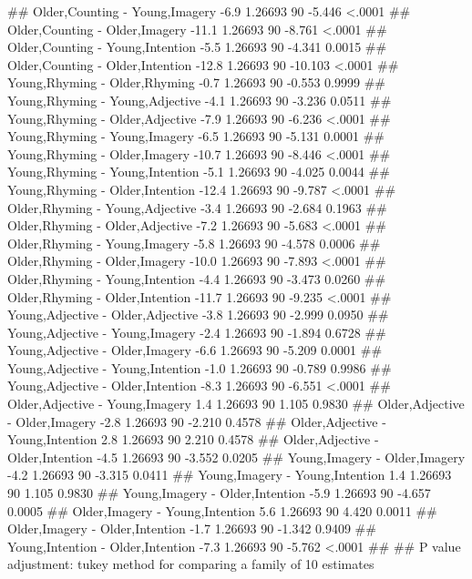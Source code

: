 \documentclass[]{article}
\newenvironment{Shaded}{\begin{snugshade}}{\end{snugshade}}
\newcommand{\NormalTok}[1]{#1}
\theoremstyle{definition}
\theoremstyle{definition}
\theoremstyle{definition}
\theoremstyle{remark}
\begin{document}
\begin{Shaded}
\begin{Highlighting}[]
\NormalTok{##  Older,Counting - Young,Imagery        -6.9 1.26693 90  -5.446  <.0001}
\NormalTok{##  Older,Counting - Older,Imagery       -11.1 1.26693 90  -8.761  <.0001}
\NormalTok{##  Older,Counting - Young,Intention      -5.5 1.26693 90  -4.341  0.0015}
\NormalTok{##  Older,Counting - Older,Intention     -12.8 1.26693 90 -10.103  <.0001}
\NormalTok{##  Young,Rhyming - Older,Rhyming         -0.7 1.26693 90  -0.553  0.9999}
\NormalTok{##  Young,Rhyming - Young,Adjective       -4.1 1.26693 90  -3.236  0.0511}
\NormalTok{##  Young,Rhyming - Older,Adjective       -7.9 1.26693 90  -6.236  <.0001}
\NormalTok{##  Young,Rhyming - Young,Imagery         -6.5 1.26693 90  -5.131  0.0001}
\NormalTok{##  Young,Rhyming - Older,Imagery        -10.7 1.26693 90  -8.446  <.0001}
\NormalTok{##  Young,Rhyming - Young,Intention       -5.1 1.26693 90  -4.025  0.0044}
\NormalTok{##  Young,Rhyming - Older,Intention      -12.4 1.26693 90  -9.787  <.0001}
\NormalTok{##  Older,Rhyming - Young,Adjective       -3.4 1.26693 90  -2.684  0.1963}
\NormalTok{##  Older,Rhyming - Older,Adjective       -7.2 1.26693 90  -5.683  <.0001}
\NormalTok{##  Older,Rhyming - Young,Imagery         -5.8 1.26693 90  -4.578  0.0006}
\NormalTok{##  Older,Rhyming - Older,Imagery        -10.0 1.26693 90  -7.893  <.0001}
\NormalTok{##  Older,Rhyming - Young,Intention       -4.4 1.26693 90  -3.473  0.0260}
\NormalTok{##  Older,Rhyming - Older,Intention      -11.7 1.26693 90  -9.235  <.0001}
\NormalTok{##  Young,Adjective - Older,Adjective     -3.8 1.26693 90  -2.999  0.0950}
\NormalTok{##  Young,Adjective - Young,Imagery       -2.4 1.26693 90  -1.894  0.6728}
\NormalTok{##  Young,Adjective - Older,Imagery       -6.6 1.26693 90  -5.209  0.0001}
\NormalTok{##  Young,Adjective - Young,Intention     -1.0 1.26693 90  -0.789  0.9986}
\NormalTok{##  Young,Adjective - Older,Intention     -8.3 1.26693 90  -6.551  <.0001}
\NormalTok{##  Older,Adjective - Young,Imagery        1.4 1.26693 90   1.105  0.9830}
\NormalTok{##  Older,Adjective - Older,Imagery       -2.8 1.26693 90  -2.210  0.4578}
\NormalTok{##  Older,Adjective - Young,Intention      2.8 1.26693 90   2.210  0.4578}
\NormalTok{##  Older,Adjective - Older,Intention     -4.5 1.26693 90  -3.552  0.0205}
\NormalTok{##  Young,Imagery - Older,Imagery         -4.2 1.26693 90  -3.315  0.0411}
\NormalTok{##  Young,Imagery - Young,Intention        1.4 1.26693 90   1.105  0.9830}
\NormalTok{##  Young,Imagery - Older,Intention       -5.9 1.26693 90  -4.657  0.0005}
\NormalTok{##  Older,Imagery - Young,Intention        5.6 1.26693 90   4.420  0.0011}
\NormalTok{##  Older,Imagery - Older,Intention       -1.7 1.26693 90  -1.342  0.9409}
\NormalTok{##  Young,Intention - Older,Intention     -7.3 1.26693 90  -5.762  <.0001}
\NormalTok{## }
\NormalTok{## P value adjustment: tukey method for comparing a family of 10 estimates}
\end{Highlighting}
\end{Shaded}
\end{document}
